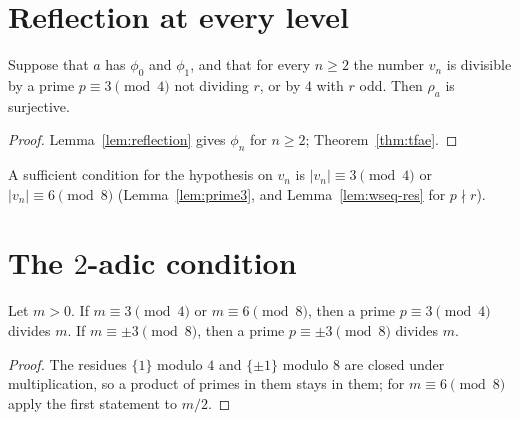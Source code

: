 \section{Reflection at every level}

\begin{proposition}
  \label{prop:crit-reflection}
  \leanok
  Suppose that $a$ has $\phi_0$ and $\phi_1$, and that for every $n \ge 2$ the number $v_n$
  is divisible by a prime $p \equiv 3 \pmod 4$ not dividing $r$, or by $4$ with $r$ odd. Then
  $\rho_a$ is surjective.
\end{proposition}
\begin{proof}
  \leanok
  Lemma~\ref{lem:reflection} gives $\phi_n$ for $n \ge 2$; Theorem~\ref{thm:tfae}.
\end{proof}

A sufficient condition for the hypothesis on $v_n$ is $|v_n| \equiv 3 \pmod 4$ or
$|v_n| \equiv 6 \pmod 8$ (Lemma~\ref{lem:prime3}, and Lemma~\ref{lem:wseq-res} for $p \nmid r$).

\section{The \texorpdfstring{$2$}{2}-adic condition}

\begin{lemma}
  \label{lem:prime3}
  \leanok
  Let $m > 0$. If $m \equiv 3 \pmod 4$ or $m \equiv 6 \pmod 8$, then a prime $p \equiv 3 \pmod 4$
  divides $m$. If $m \equiv \pm 3 \pmod 8$, then a prime $p \equiv \pm 3 \pmod 8$ divides $m$.
\end{lemma}
\begin{proof}
  \leanok
  The residues $\{1\}$ modulo $4$ and $\{\pm 1\}$ modulo $8$ are closed under multiplication, so
  a product of primes in them stays in them; for $m \equiv 6 \pmod 8$ apply the first statement to
  $m/2$.
\end{proof}

